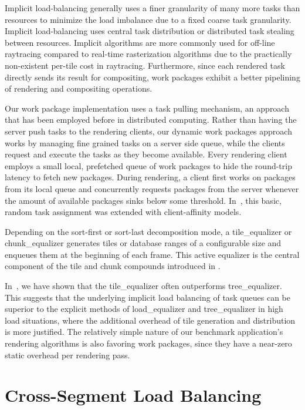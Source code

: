 Implicit load-balancing generally uses a finer granularity of many more tasks
than resources to minimize the load imbalance due to a fixed coarse task
granularity. Implicit load-balancing uses central task distribution or
distributed task stealing between resources. Implicit algorithms are more
commonly used for off-line raytracing compared to real-time rasterization
algorithms due to the practically non-existent per-tile cost in raytracing.
Furthermore, since each rendered task directly sends its result for
compositing, work packages exhibit a better pipelining of rendering and
compositing operations.

Our work package implementation uses a task pulling mechanism, an approach that
has been employed before in distributed computing. Rather than having the
server push tasks to the rendering clients, our dynamic work packages approach
works by managing fine grained tasks on a server side queue, while the clients
request and execute the tasks as they become available. Every rendering client
employs a small local, prefetched queue of work packages to hide the round-trip
latency to fetch new packages. During rendering, a client first works on
packages from its local queue and concurrently requests packages from the
server whenever the amount of available packages sinks below some threshold.
In~\cite{SPEP:16}, this basic, random task assignment was extended with
client-affinity models.

Depending on the sort-first or sort-last decomposition mode, a
\textsf{tile\_equalizer} or \textsf{chunk\_equalizer} generates tiles or
database ranges of a configurable size and enqueues them at the beginning of
each frame. This active equalizer is the central component of the tile and chunk
compounds introduced in .

In~\cite{SPEP:16}, we have shown that the \textsf{tile\_equalizer} often
outperforms \textsf{tree\_equalizer}. This suggests that the underlying implicit
load balancing of task queues can be superior to the explicit methods of
\textsf{load\_equalizer} and \textsf{tree\_equalizer} in high load situations,
where the additional overhead of tile generation and distribution is more
justified. The relatively simple nature of our benchmark application's rendering
algorithms is also favoring work packages, since they have a near-zero static
overhead per rendering pass.


\section{Cross-Segment Load Balancing}

